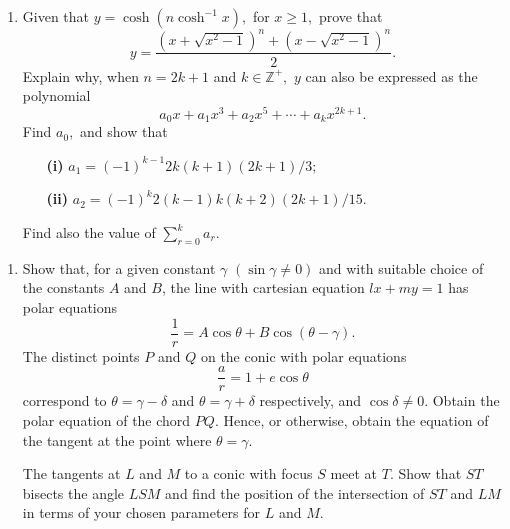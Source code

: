 \documentclass[a4, 11pt]{report}
\newlength{\qspace}
\newcounter{qnumber}
\newenvironment{question}%
 {\vspace{\qspace}
  \begin{enumerate}[\bfseries 1\quad][10]%
    \setcounter{enumi}{\value{qnumber}}%
    \item%
 }
{
  \end{enumerate}
  \filbreak
  \stepcounter{qnumber}
 }
\begin{document}
\begin{question}
Given that $y=\cosh(n\cosh^{-1}x),$ for $x\geqslant1,$ prove that
\[
y=\frac{(x+\sqrt{x^{2}-1})^{n}+(x-\sqrt{x^{2}-1})^{n}}{2}.
\]
Explain why, when $n=2k+1$ and $k\in\mathbb{Z}^{+},$ $y$ can also
be expressed as the polynomial 
\[
a_{0}x+a_{1}x^{3}+a_{2}x^{5}+\cdots+a_{k}x^{2k+1}.
\]
Find $a_{0},$ and show that 

\begin{itemize}
\setlength{\itemsep}{3mm}
\item[\bf (i)] $a_{1}=(-1)^{k-1}2k(k+1)(2k+1)/3$; 
\item[\bf (ii)] $a_{2}=(-1)^{k}2(k-1)k(k+2)(2k+1)/15.$
	\end{itemize}

Find also the value of ${\displaystyle \sum_{r=0}^{k}a_{r}.}$ 
	\end{question}
	
	\begin{question}
Show that, for a given constant $\gamma$ $(\sin\gamma\neq0)$ and
with suitable choice of the constants $A$ and $B$, the line with
cartesian equation $lx+my=1$ has polar equations 
\[
\frac{1}{r}=A\cos\theta+B\cos(\theta-\gamma).
\]
The distinct points $P$ and $Q$ on the conic with polar equations
\[
\frac{a}{r}=1+e\cos\theta
\]
correspond to $\theta=\gamma-\delta$ and $\theta=\gamma+\delta$
respectively, and $\cos\delta\neq0.$ Obtain the polar equation of
the chord $PQ.$ Hence, or otherwise, obtain the equation of the tangent
at the point where $\theta=\gamma.$


The tangents at $L$ and $M$ to a conic with focus $S$ meet at $T.$
Show that $ST$ bisects the angle $LSM$ and find the position of
the intersection of $ST$ and $LM$ in terms of your chosen parameters
for $L$ and $M.$ 
	 \end{question}
	 
\end{document}
